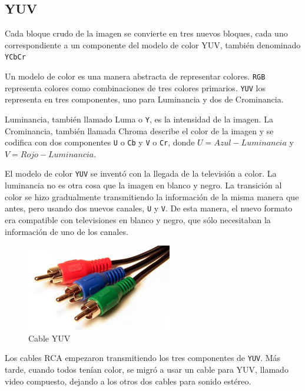 \subsection{YUV}\label{sub:yuv}

Cada bloque crudo de la imagen se convierte en tres nuevos bloques, cada uno
correspondiente a un componente del modelo de color \gls{YUV}, también
denominado \verb+YCbCr+

Un modelo de color es una manera abstracta de representar colores. \verb+RGB+
representa colores como combinaciones de tres colores primarios. \verb+YUV+ los
representa en tres componentes, uno para Luminancia y dos de Crominancia.

\gls{Luminancia}, también llamado Luma o \verb+Y+, es la intensidad de la imagen. La
\gls{Crominancia}, también llamada Chroma describe el color de la imagen y se
codifica con dos componentes \verb+U+ o \verb+Cb+ y \verb+V+ o \verb+Cr+, donde
$U = Azul - Luminancia$ y $V = Rojo - Luminancia$.

El modelo de color \verb+YUV+ se inventó con la llegada de la televisión a
color. La luminancia no es otra cosa que la imagen en blanco y negro. La
transición al color se hizo gradualmente transmitiendo la información de la
misma manera que antes, pero usando dos nuevos canales, \verb+U+ y \verb+V+. De
esta manera, el nuevo formato era compatible con televisiones en blanco y
negro, que sólo necesitaban la información de uno de los canales.

\begin{figure}[hb]
\includegraphics{yuv_cable}
    \caption{Cable YUV}
\end{figure}

Los cables RCA empezaron transmitiendo los tres componentes de \verb+YUV+. Más
tarde, cuando todos tenían color, se migró a usar un cable para \gls{YUV},
llamado video compuesto, dejando a los otros dos cables para sonido estéreo.

